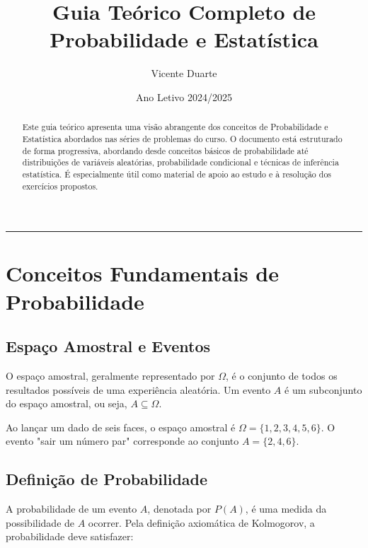 \documentclass[a4paper,12pt]{article}
\title{\Huge \textbf{Guia Teórico Completo de Probabilidade e Estatística}}
\author{Vicente Duarte}
\date{Ano Letivo 2024/2025}
\begin{document}
\maketitle
\thispagestyle{empty}

\begin{center}
\rule{\textwidth}{1pt}
\end{center}

\begin{abstract}
Este guia teórico apresenta uma visão abrangente dos conceitos de Probabilidade e Estatística abordados nas séries de problemas do curso. O documento está estruturado de forma progressiva, abordando desde conceitos básicos de probabilidade até distribuições de variáveis aleatórias, probabilidade condicional e técnicas de inferência estatística. É especialmente útil como material de apoio ao estudo e à resolução dos exercícios propostos.
\end{abstract}

\tableofcontents
\newpage

\section{Conceitos Fundamentais de Probabilidade}

\subsection{Espaço Amostral e Eventos}

O espaço amostral, geralmente representado por $\Omega$, é o conjunto de todos os resultados possíveis de uma experiência aleatória. Um evento $A$ é um subconjunto do espaço amostral, ou seja, $A \subseteq \Omega$.

\begin{tcolorbox}[colback=gray!10, colframe=black, title=\textbf{Exemplo}]
Ao lançar um dado de seis faces, o espaço amostral é $\Omega = \{1, 2, 3, 4, 5, 6\}$. O evento "sair um número par" corresponde ao conjunto $A = \{2, 4, 6\}$.
\end{tcolorbox}

\subsection{Definição de Probabilidade}

A probabilidade de um evento $A$, denotada por $P(A)$, é uma medida da possibilidade de $A$ ocorrer. Pela definição axiomática de Kolmogorov, a probabilidade deve satisfazer:
\end{document}
